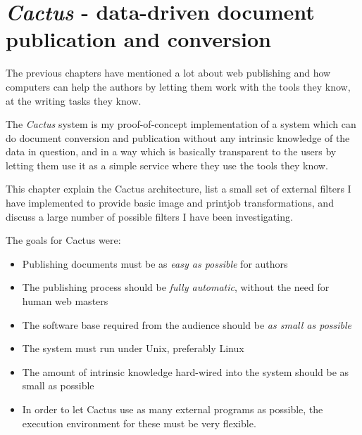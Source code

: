 %
%


\chapter{\textit{Cactus} - data-driven document publication
 and conversion}

\label{cha:cactus}
\label{sec:cactus}


The previous chapters have mentioned a lot about web
publishing and how computers can help the authors by letting
them work with the tools they know, at the writing tasks
they know.

The \textit{Cactus} system is my proof-of-concept
implementation of a system which can do document conversion
and publication without any intrinsic knowledge of the data
in question, and in a way which is basically transparent to
the users by letting them use it as a simple service where
they use the tools they know.

This chapter explain the Cactus architecture,
 list a small set
of external filters I have implemented to provide basic
image and printjob transformations, and
 discuss
a large number of possible filters I have been
investigating.

The goals for Cactus were:

\begin{itemize}
\item Publishing documents must be as \textit{easy as
    possible} for authors
  
\item The publishing process should be \textit{fully
    automatic}, without the need for human web masters
  
\item The software base required from the audience should be
  \textit{as small as possible}
  
\item The system must run under Unix, preferably Linux
  
\item The amount of intrinsic knowledge hard-wired into the
  system should be as small as possible

\item In order to let Cactus use as many external programs as
  possible, the execution environment for these must be very
  flexible. 
\end{itemize}


